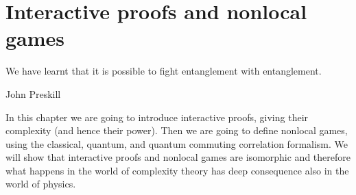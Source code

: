 \section{Interactive proofs and nonlocal games}
\epigraph{We have learnt that it is possible to fight entanglement with entanglement.}{John Preskill}

In this chapter we are going to introduce interactive proofs, giving their complexity (and hence their power). Then we are going to define nonlocal games, using the classical, quantum, and quantum commuting correlation formalism. We will show that interactive proofs and nonlocal games are isomorphic and therefore what happens in the world of complexity theory has deep consequence also in the world of physics.

